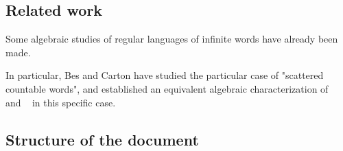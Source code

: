 \subsection{Related work}
Some algebraic studies of regular languages of infinite words have already been made.
\cite{Etessami99}
\tc{}

In particular, Bes and Carton have studied the particular case of "scattered countable words", and established
an equivalent algebraic characterization of \fo\  \cite{BesCarton11} and \wmso\ \cite{BesCartonPersonal} in this specific case.

\subsection{Structure of the document}




